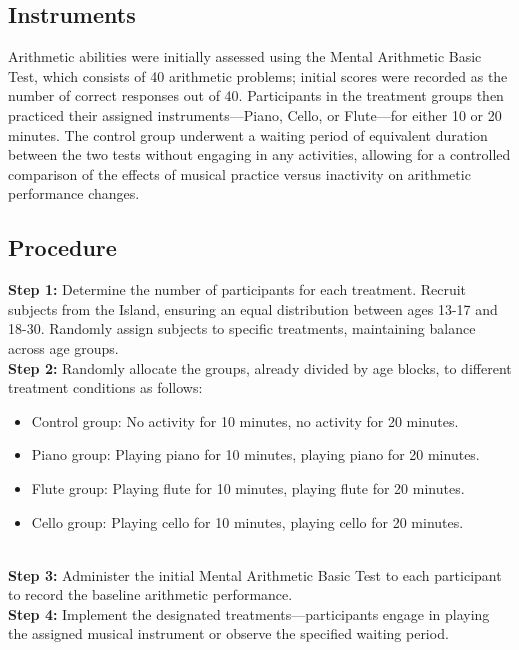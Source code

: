 \documentclass[11pt]{article}
\begin{document}
\subsection{Instruments}

Arithmetic abilities were initially assessed using the Mental Arithmetic Basic Test, which consists of 40 arithmetic problems; initial scores were recorded as the number of correct responses out of 40. Participants in the treatment groups then practiced their assigned instruments—Piano, Cello, or Flute—for either 10 or 20 minutes. The control group underwent a waiting period of equivalent duration between the two tests without engaging in any activities, allowing for a controlled comparison of the effects of musical practice versus inactivity on arithmetic performance changes.


\subsection{Procedure}

\textbf{Step 1:} Determine the number of participants for each treatment. Recruit subjects from the Island, ensuring an equal distribution between ages 13-17 and 18-30. Randomly assign subjects to specific treatments, maintaining balance across age groups.\\

\noindent \textbf{Step 2:} Randomly allocate the groups, already divided by age blocks, to different treatment conditions as follows: \begin{itemize} \item Control group: No activity for 10 minutes, no activity for 20 minutes. \item Piano group: Playing piano for 10 minutes, playing piano for 20 minutes. \item Flute group: Playing flute for 10 minutes, playing flute for 20 minutes. \item Cello group: Playing cello for 10 minutes, playing cello for 20 minutes. \end{itemize}\\

\noindent \textbf{Step 3:} Administer the initial Mental Arithmetic Basic Test to each participant to record the baseline arithmetic performance.\\

\noindent \textbf{Step 4:} Implement the designated treatments—participants engage in playing the assigned musical instrument or observe the specified waiting period.\\
\end{document}
